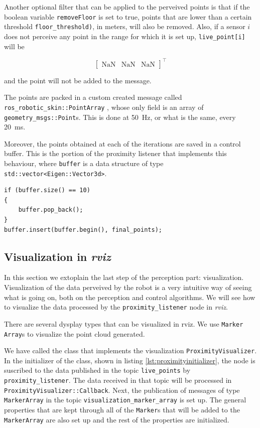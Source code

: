 Another optional filter that can be applied to the perveived points is that if the boolean variable \lstinline{removeFloor} is set to true, points that are lower than a certain threshold \lstinline{floor_threshold)}, in meters, will also be removed. Also, if a sensor $i$ does not perceive any point in the range for which it is set up, \lstinline{live_point[i]} will be

$$
\begin{bmatrix}
\text{NaN} & \text{NaN} & \text{NaN}
\end{bmatrix}
^{\intercal}
$$

and the point will not be added to the message.

The points are packed in a custom created message called \lstinline{ros_robotic_skin::PointArray} , whose only field is an array of \lstinline{geometry_msgs::Point}s. This is done at \SI{50}{\hertz}, or what is the same, every \SI{20}{\milli \second}.

Moreover, the points obtained at each of the iterations are saved in a control buffer. This is the portion of the proximity listener that implements this behaviour, where \lstinline{buffer} is a data structure of type \lstinline{std::vector<Eigen::Vector3d>}.

\begin{lstlisting}[caption={Initializer of the ProximityVisualizer class},captionpos=b,label={lst:proximityinitializer}]
if (buffer.size() == 10)
{
    buffer.pop_back();
}
buffer.insert(buffer.begin(), final_points);
\end{lstlisting}

\subsection{Visualization in \textit{rviz}}
\label{ss:visualization}

In this section we extoplain the last step of the perception part: visualization. Visualization of the data perveived by the robot is a very intuitive way of seeing what is going on, both on the perception and control algorithms. We will see how to visualize the data processed by the \lstinline{proximity_listener} node in \textit{rviz}.

There are several dysplay types that can be visualized in rviz. We use \lstinline{Marker Array}s \cite{rvizmarker} to visualize the point cloud generated.

We have called the class that implements the visualization \lstinline{ProximityVisualizer}. In the initializer of the class, shown in listing \ref{lst:proximityinitializer}, the node is suscribed  to the data published in the topic \lstinline{live_points} by \lstinline{proximity_listener}. The data received in that topic will be processed in \lstinline{ProximityVisualizer::Callback}. Next, the publication of messages of type \lstinline{MarkerArray} in the topic \lstinline{visualization_marker_array} is set up. The general properties that are kept through all of the \lstinline{Marker}s that will be added to the \lstinline{MarkerArray} are also set up and the rest of the properties are initialized.

